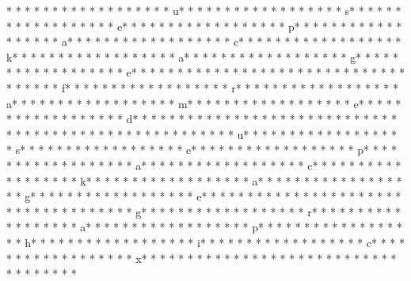 * * *  * * *  * * *  *  * * *  *  * * *  * u* * *  * * *  * * *  *  * * *  *  * * *  * s* * *  * * *  * * *  *  * * *  *  * * *  * e* * *  * * *  * * *  *  * * *  *  * * *  * p* * *  * * *  * * *  *  * * *  *  * * *  * a* * *  * * *  * * *  *  * * *  *  * * *  * c* * *  * * *  * * *  *  * * *  *  * * *  * k* * *  * * *  * * *  *  * * *  *  * * *  * a* * *  * * *  * * *  *  * * *  *  * * *  * g* * *  * * *  * * *  *  * * *  *  * * *  * e* * *  * * *  * * *  *  * * *  *  * * *  * {* * *  * * *  * * *  *  * * *  *  * * *  * f* * *  * * *  * * *  *  * * *  *  * * *  * r* * *  * * *  * * *  *  * * *  *  * * *  * a* * *  * * *  * * *  *  * * *  *  * * *  * m* * *  * * *  * * *  *  * * *  *  * * *  * e* * *  * * *  * * *  *  * * *  *  * * *  * d* * *  * * *  * * *  *  * * *  *  * * *  * }* * *  * * *  * * *  *  * * *  *  * * *  * 
* * *  * * *  * * *  *  * * *  *  * * *  * u* * *  * * *  * * *  *  * * *  *  * * *  * s* * *  * * *  * * *  *  * * *  *  * * *  * e* * *  * * *  * * *  *  * * *  *  * * *  * p* * *  * * *  * * *  *  * * *  *  * * *  * a* * *  * * *  * * *  *  * * *  *  * * *  * c* * *  * * *  * * *  *  * * *  *  * * *  * k* * *  * * *  * * *  *  * * *  *  * * *  * a* * *  * * *  * * *  *  * * *  *  * * *  * g* * *  * * *  * * *  *  * * *  *  * * *  * e* * *  * * *  * * *  *  * * *  *  * * *  * {* * *  * * *  * * *  *  * * *  *  * * *  * g* * *  * * *  * * *  *  * * *  *  * * *  * r* * *  * * *  * * *  *  * * *  *  * * *  * a* * *  * * *  * * *  *  * * *  *  * * *  * p* * *  * * *  * * *  *  * * *  *  * * *  * h* * *  * * *  * * *  *  * * *  *  * * *  * i* * *  * * *  * * *  *  * * *  *  * * *  * c* * *  * * *  * * *  *  * * *  *  * * *  * x* * *  * * *  * * *  *  * * *  *  * * *  * }* * *  * * *  * * *  *  * * *  *  * * *  * 
